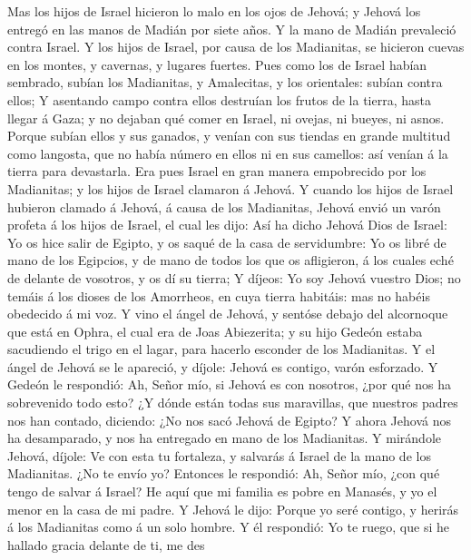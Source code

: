  Mas los hijos de Israel hicieron lo malo en los ojos de
Jehová; y Jehová los entregó en las manos de Madián por siete años.
 Y la mano de Madián prevaleció contra Israel. Y los hijos
de Israel, por causa de los Madianitas, se hicieron cuevas en los
montes, y cavernas, y lugares fuertes.  Pues como los de
Israel habían sembrado, subían los Madianitas, y Amalecitas, y los
orientales: subían contra ellos;  Y asentando campo contra
ellos destruían los frutos de la tierra, hasta llegar á Gaza; y no
dejaban qué comer en Israel, ni ovejas, ni bueyes, ni asnos.
 Porque subían ellos y sus ganados, y venían con sus tiendas
en grande multitud como langosta, que no había número en ellos ni en sus
camellos: así venían á la tierra para devastarla.  Era pues
Israel en gran manera empobrecido por los Madianitas; y los hijos de
Israel clamaron á Jehová.  Y cuando los hijos de Israel
hubieron clamado á Jehová, á causa de los Madianitas, 
Jehová envió un varón profeta á los hijos de Israel, el cual les dijo:
Así ha dicho Jehová Dios de Israel: Yo os hice salir de Egipto, y os
saqué de la casa de servidumbre:  Yo os libré de mano de los
Egipcios, y de mano de todos los que os afligieron, á los cuales eché de
delante de vosotros, y os dí su tierra;  Y díjeos: Yo soy
Jehová vuestro Dios; no temáis á los dioses de los Amorrheos, en cuya
tierra habitáis: mas no habéis obedecido á mi voz.  Y vino
el ángel de Jehová, y sentóse debajo del alcornoque que está en Ophra,
el cual era de Joas Abiezerita; y su hijo Gedeón estaba sacudiendo el
trigo en el lagar, para hacerlo esconder de los Madianitas.
 Y el ángel de Jehová se le apareció, y díjole: Jehová es
contigo, varón esforzado.  Y Gedeón le respondió: Ah, Señor
mío, si Jehová es con nosotros, ¿por qué nos ha sobrevenido todo esto?
¿Y dónde están todas sus maravillas, que nuestros padres nos han
contado, diciendo: ¿No nos sacó Jehová de Egipto? Y ahora Jehová nos ha
desamparado, y nos ha entregado en mano de los Madianitas. 
Y mirándole Jehová, díjole: Ve con esta tu fortaleza, y salvarás á
Israel de la mano de los Madianitas. ¿No te envío yo? 
Entonces le respondió: Ah, Señor mío, ¿con qué tengo de salvar á Israel?
He aquí que mi familia es pobre en Manasés, y yo el menor en la casa de
mi padre.  Y Jehová le dijo: Porque yo seré contigo, y
herirás á los Madianitas como á un solo hombre.  Y él
respondió: Yo te ruego, que si he hallado gracia delante de ti, me des
